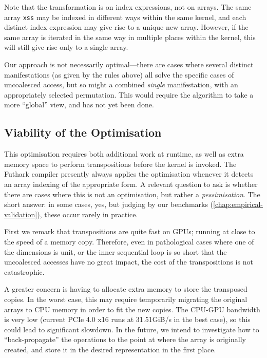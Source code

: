 Note that the transformation is on index expressions, not on arrays.
The same array \lstinline{xss} may be indexed in different ways within
the same kernel, and each distinct index expression may give rise to a
unique new  array.  However, if the same array is
iterated in the same way in multiple places within the kernel, this
will still give rise only to a single array.

Our approach is not necessarily optimal---there are cases where
several distinct manifestations (as given by the rules above) all
solve the specific cases of uncoalesced access, but so might a
combined \textit{single} manifestation, with an appropriately selected
permutation.  This would require the algorithm to take a more
``global'' view, and has not yet been done.

\subsection{Viability of the Optimisation}

This optimisation requires both additional work at runtime, as well as
extra memory space to perform transpositions before the kernel is
invoked.  The Futhark compiler presently always applies the
optimisation whenever it detects an array indexing of the appropriate
form.  A relevant question to ask is whether there are cases where
this is not an optimisation, but rather a \textit{pessimisation}.  The
short answer: in some cases, yes, but judging by our benchmarks
(\cref{chap:empirical-validation}), these occur rarely in practice.

First we remark that transpositions are quite fast on GPUs; running at
close to the speed of a memory copy.  Therefore, even in pathological
cases where one of the dimensions is unit, or the inner sequential
loop is so short that the uncoalesced accesses have no great impact,
the cost of the transpositions is not catastrophic.

A greater concern is having to allocate extra memory to store the
transposed copies.  In the worst case, this may require temporarily
migrating the original arrays to CPU memory in order to fit the new
copies.  The CPU-GPU bandwidth is very low (current PCIe 4.0 x16 runs
at 31.51GiB/s in the best case), so this could lead to significant
slowdown.  In the future, we intend to investigate how to
``back-propagate'' the  operations to the point at where
the array is originally created, and store it in the desired
representation in the first place.

